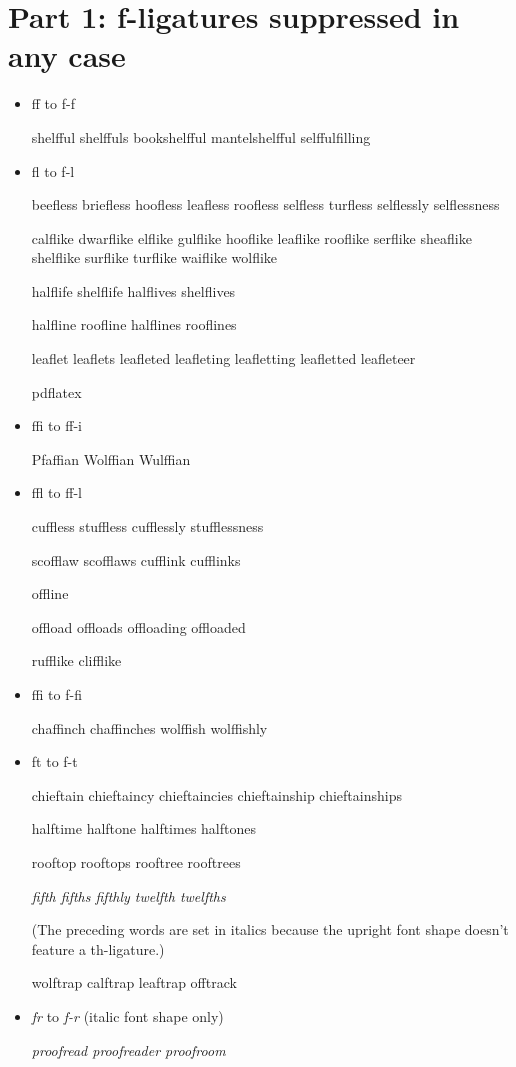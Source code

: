 


\section*{Part 1: f-ligatures suppressed in any case}


\begin{itemize}

\item ff to f-f

shelfful shelffuls bookshelfful mantelshelfful selffulfilling


\item fl to f-l

beefless briefless hoofless leafless roofless selfless turfless selflessly selflessness

calflike dwarflike elflike gulflike hooflike leaflike rooflike serflike sheaflike shelflike surflike turflike waiflike wolflike

halflife shelflife
halflives shelflives

halfline roofline
halflines rooflines

leaflet leaflets leafleted leafleting leafletting leafletted leafleteer

pdflatex


\item ffi to ff-i

Pfaffian Wolffian Wulffian


\item ffl to ff-l

cuffless stuffless cufflessly stufflessness

scofflaw scofflaws cufflink cufflinks

offline

offload offloads offloading offloaded

rufflike clifflike


\item ffi to f-fi

chaffinch chaffinches wolffish wolffishly


\item ft to f-t

chieftain chieftaincy chieftaincies chieftainship chieftainships

halftime halftone halftimes halftones

rooftop rooftops rooftree rooftrees

\emph{fifth fifths fifthly twelfth twelfths}

(The preceding words are set in italics because the upright font shape doesn't feature a th-ligature.)

wolftrap calftrap leaftrap offtrack


\item \emph{fr} to \emph{f-r} (italic font shape only)

\emph{proofread proofreader proofroom}



\end{itemize}

